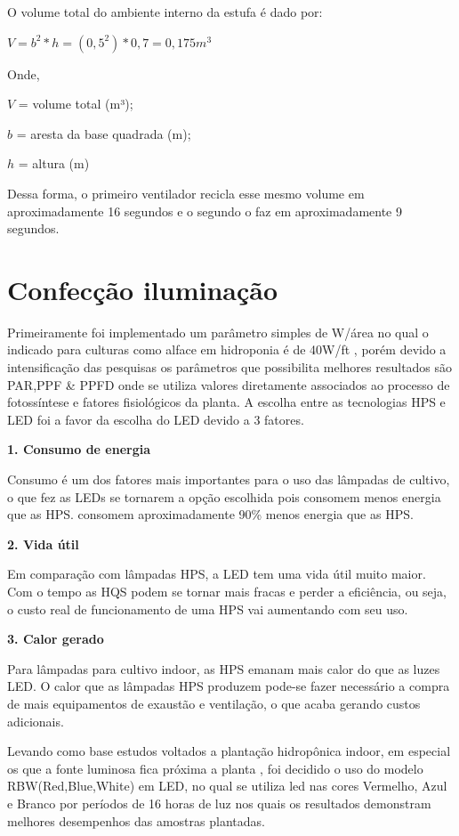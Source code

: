 O volume total do ambiente interno da estufa é dado por:

\begin{center}
	\large
	${\displaystyle V = b^2 * h = (0,5^2) * 0,7 = 0,175 m^3}$
\end{center}

Onde,

$V$ = volume total (m³);

$b$ = aresta da base quadrada (m);

$h$ = altura (m)

Dessa forma, o primeiro ventilador recicla esse mesmo volume em aproximadamente 16 segundos e o segundo o faz em aproximadamente 9 segundos.  

\section{Confecção iluminação}

Primeiramente foi implementado um parâmetro simples de W/área no qual o indicado para culturas como alface em hidroponia é de 40W/ft , porém devido a intensificação das pesquisas os parâmetros que possibilita melhores resultados são  PAR,PPF \& PPFD onde se utiliza valores diretamente associados ao processo de fotossíntese e fatores fisiológicos da planta.
A escolha entre as tecnologias HPS e LED foi a favor da escolha do LED devido a 3 fatores.

\textbf{1. Consumo de energia}

Consumo é um dos fatores mais importantes para o uso das lâmpadas de cultivo, o que fez as LEDs se tornarem a opção escolhida pois consomem menos energia que as HPS. consomem aproximadamente 90\% menos energia que as HPS.

\textbf{2. Vida útil}

Em comparação com lâmpadas HPS, a LED tem uma vida útil muito maior. Com o tempo as HQS podem se tornar mais fracas e perder a eficiência, ou seja, o custo real de funcionamento de uma HPS vai aumentando com seu uso.

\textbf{3. Calor gerado}

Para lâmpadas para cultivo indoor, as HPS emanam mais calor do que as luzes LED. O calor que as lâmpadas HPS produzem pode-se fazer necessário a compra de mais equipamentos de exaustão e ventilação, o que acaba gerando custos adicionais.

Levando como base estudos voltados a plantação hidropônica indoor, em especial os que a fonte luminosa fica próxima a planta , foi decidido o uso do modelo RBW(Red,Blue,White) em LED, no qual se utiliza led nas cores Vermelho, Azul e Branco por períodos de 16 horas de luz  nos quais os resultados demonstram melhores desempenhos das amostras plantadas. 

